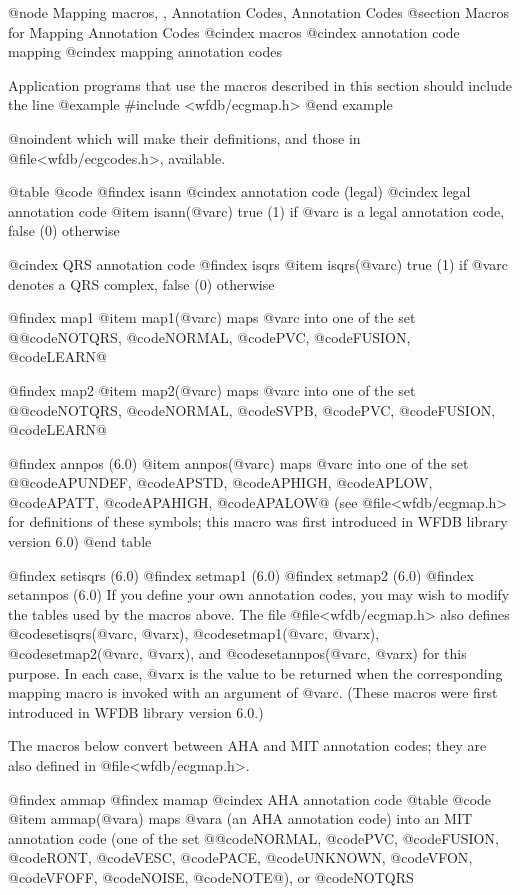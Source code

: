 {{{{{{{{{{@node    Mapping macros, , Annotation Codes, Annotation Codes
@section Macros for Mapping Annotation Codes
@cindex macros
@cindex annotation code mapping
@cindex mapping annotation codes

Application programs that use the macros described in this section
should include the line
@example
#include <wfdb/ecgmap.h>
@end example

@noindent
which will make their definitions, and those in @file{<wfdb/ecgcodes.h>},
available.

@table @code
@findex isann
@cindex annotation code (legal)
@cindex legal annotation code
@item isann(@var{c})
true (1) if @var{c} is a legal annotation code, false (0)
otherwise

@cindex QRS annotation code
@findex isqrs
@item isqrs(@var{c})
true (1) if @var{c} denotes a QRS complex, false (0) otherwise

@findex map1
@item map1(@var{c})
maps @var{c} into one of the set @{@code{NOTQRS}, @code{NORMAL},
@code{PVC}, @code{FUSION}, @code{LEARN}@}

@findex map2
@item map2(@var{c})
maps @var{c} into one of the set @{@code{NOTQRS}, @code{NORMAL},
@code{SVPB}, @code{PVC}, @code{FUSION}, @code{LEARN}@}

@findex annpos (6.0)
@item annpos(@var{c})
maps @var{c} into one of the set @{@code{APUNDEF}, @code{APSTD},
@code{APHIGH}, @code{APLOW}, @code{APATT}, @code{APAHIGH},
@code{APALOW}@} (see @file{<wfdb/ecgmap.h>} for definitions of these
symbols;  this macro was first introduced in WFDB library version 6.0)
@end table

@findex setisqrs (6.0)
@findex setmap1 (6.0)
@findex setmap2 (6.0)
@findex setannpos (6.0)
If you define your own annotation codes, you may wish to modify the
tables used by the macros above.  The file @file{<wfdb/ecgmap.h>} also defines
@code{setisqrs(@var{c}, @var{x})}, @code{setmap1(@var{c}, @var{x})},
@code{setmap2(@var{c}, @var{x})}, and @code{setannpos(@var{c}, @var{x})}
for this purpose.  In each case, @var{x} is the value to be returned
when the corresponding mapping macro is invoked with an argument of
@var{c}.  (These macros were first introduced in WFDB library version
6.0.)

The macros below convert between AHA and MIT annotation codes;  they are
also defined in @file{<wfdb/ecgmap.h>}.

@findex ammap
@findex mamap
@cindex AHA annotation code
@table @code
@item ammap(@var{a})
maps @var{a} (an AHA annotation code) into an MIT annotation code
(one of the set @{@code{NORMAL}, @code{PVC}, @code{FUSION}, @code{RONT},
@code{VESC}, @code{PACE}, @code{UNKNOWN}, @code{VFON}, @code{VFOFF},
@code{NOISE}, @code{NOTE}@}), or @code{NOTQRS}

}}}}}}}}}}
